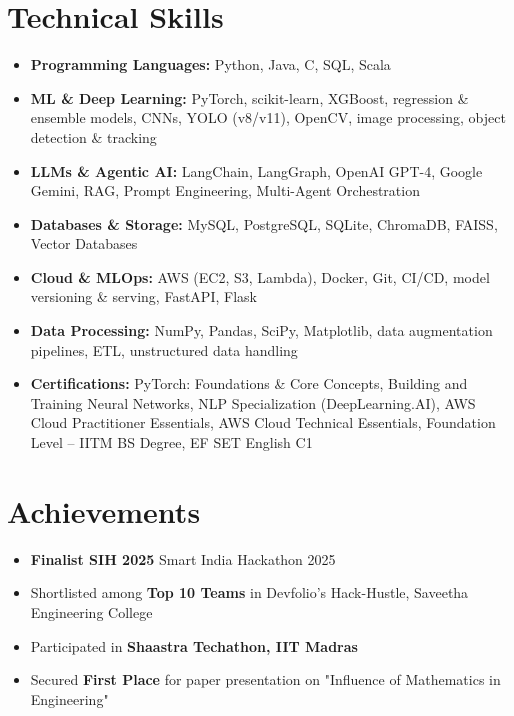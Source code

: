 \documentclass[letterpaper,11pt]{article}
\newcommand{\resumeItem}[1]{
  \item\small{
    {#1 \vspace{-2pt}}
  }
}
\newcommand{\resumeItemListStart}{\begin{itemize}}
\newcommand{\resumeItemListEnd}{\end{itemize}\vspace{-5pt}}
\begin{document}
  \section{Technical Skills}
 \resumeItemListStart
    \resumeItem{\textbf{Programming Languages:} Python, Java, C, SQL, Scala}
    \resumeItem{\textbf{ML \& Deep Learning:} PyTorch, scikit-learn, XGBoost, regression \& ensemble models, CNNs, YOLO (v8/v11), OpenCV, image processing, object detection \& tracking}
    \resumeItem{\textbf{LLMs \& Agentic AI:} LangChain, LangGraph, OpenAI GPT-4, Google Gemini, RAG, Prompt Engineering, Multi-Agent Orchestration}
    \resumeItem{\textbf{Databases \& Storage:} MySQL, PostgreSQL, SQLite, ChromaDB, FAISS, Vector Databases}
    \resumeItem{\textbf{Cloud \& MLOps:} AWS (EC2, S3, Lambda), Docker, Git, CI/CD, model versioning \& serving, FastAPI, Flask}
    \resumeItem{\textbf{Data Processing:} NumPy, Pandas, SciPy, Matplotlib, data augmentation pipelines, ETL, unstructured data handling}
    \resumeItem{\textbf{Certifications:} PyTorch: Foundations \& Core Concepts, Building and Training Neural Networks, NLP Specialization (DeepLearning.AI), AWS Cloud Practitioner Essentials, AWS Cloud Technical Essentials, Foundation Level -- IITM BS Degree, EF SET English C1}
 \resumeItemListEnd


\section{Achievements}
\resumeItemListStart
  \resumeItem{\textbf{Finalist SIH 2025} Smart India Hackathon 2025}
  \resumeItem{Shortlisted among \textbf{Top 10 Teams} in Devfolio's Hack-Hustle, Saveetha Engineering College}
  \resumeItem{Participated in \textbf{Shaastra Techathon, IIT Madras}}
  \resumeItem{Secured \textbf{First Place} for paper presentation on "Influence of Mathematics in Engineering"}
\resumeItemListEnd
\end{document}
